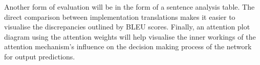 Another form of evaluation will be in the form of a sentence analysis table. The direct comparison between implementation translations makes it easier to visualise the discrepancies outlined by \acrshort{BLEU} scores.
Finally, an attention plot diagram using the attention weights will help visualise the inner workings of the attention mechanism's influence on the decision making process of the network for output predictions. 
